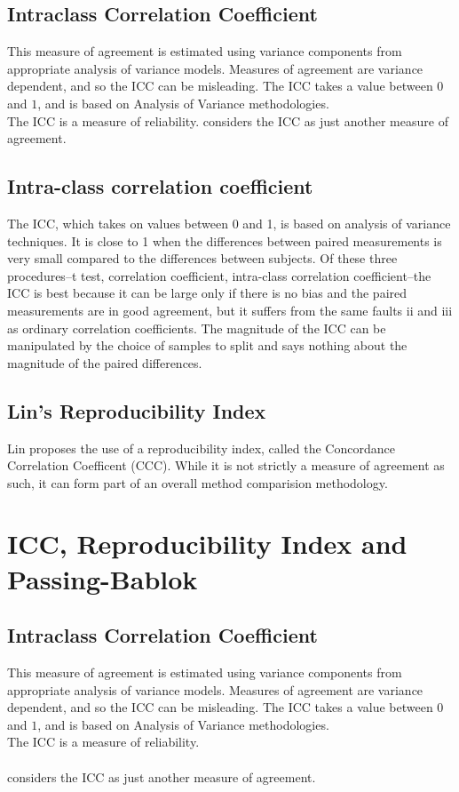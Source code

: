\documentclass[MAIN.tex]{subfiles}
\begin{document}
	
	\subsection{Intraclass Correlation Coefficient} This measure of agreement is estimated using variance components from appropriate analysis of variance models. Measures of agreement are variance dependent, and so the ICC can be misleading. The ICC takes a value between $0$ and $1$, and is based on Analysis of Variance
	methodologies.
	\\
	The ICC is a measure of reliability. \citet{bartko} considers the ICC as just another measure of agreement.
	
	
	\subsection*{Intra-class correlation coefficient}
	
	The ICC, which takes on values between 0 and 1, is based on analysis of variance techniques. It is close to 1 when the differences between paired measurements is very small compared to the differences between subjects. Of these three procedures--t test, correlation coefficient, intra-class correlation coefficient--the ICC is best because it can be large only if there is no bias and the paired measurements are in good agreement, but it suffers from the same faults ii and iii as ordinary correlation coefficients. The magnitude of the ICC can be manipulated by the choice of samples to split and says nothing about the magnitude of the paired differences.
	
	
	\subsection{Lin's Reproducibility Index} Lin proposes the use of a
	reproducibility index, called the Concordance Correlation
	Coefficent (CCC). While it is not strictly a measure of agreement
	as such, it can form part of an overall method comparision
	methodology.

\section{ICC, Reproducibility Index and Passing-Bablok }


\subsection{Intraclass Correlation Coefficient} This measure of agreement is estimated using variance components from appropriate analysis of variance models. Measures of agreement are variance dependent, and so the ICC can be misleading. The ICC takes a value between $0$ and $1$, and is based on Analysis of Variance
methodologies.
\\
The ICC is a measure of reliability.
\\
\\\citet{bartko} considers the ICC as just another measure of agreement.
\end{document}
